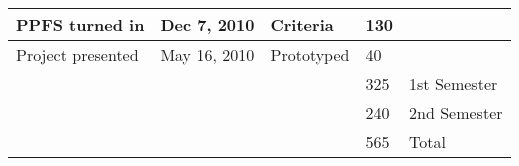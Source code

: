 {\begin{longtable}[c]{|>{\raggedright}b{2in}|>{\raggedright}b{1in}|>{\raggedright}b{1in}|b{0.75in}|b{1in}|}
PPFS turned in                             & Dec 7, 2010                                 & Criteria                  & 130 &              \\\hline
Project presented                          & May 16, 2010                                & Prototyped                & 40  &              \\\hline
                                           &                                             &                           & 325 & 1st Semester \\\hline
                                           &                                             &                           & 240 & 2nd Semester \\\hline
                                           &                                             &                           & 565 & Total        \\\hline
\end{longtable}
}
